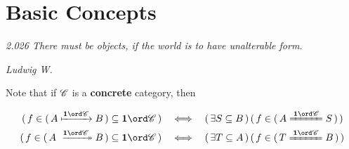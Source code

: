 \section{Basic Concepts}
\epigraph{\footnotesize \textit{2.026 There must be objects, if the world is to have unalterable form.}}{\footnotesize \textit{Ludwig W.}}

Note that if \(\mathscr{C}\) is a \textbf{concrete} category, then
\begin{theorem}
  \begin{align*}
    \blk{f\in \col{A \mono{\cc} B} \subseteq \cat{1}{\cc}} &\corres \blk{\exists S\subseteq B}\,\blk{f\in \col{A \iso{\cc} S}} \\
    \blk{f\in \col{A \epi{\cc} B} \subseteq \cat{1}{\cc}} &\corres \blk{\exists T\subseteq A}\,\blk{f\in \col{T \iso{\cc} B}}
  \end{align*}
\end{theorem}